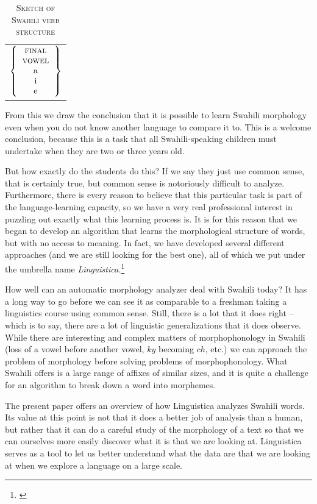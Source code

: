 \documentclass[output=paper,colorlinks,citecolor=brown,
]{langscibook}
\begin{document}
\begin{table}
\begin{tabular}{l}
$\left\{ \begin{tabular}{c} \textsc{final}\\ \textsc{vowel}\\a\\i\\e  \end{tabular}  \right\}$

\end{tabular}
\caption{\textsc{Sketch of Swahili verb structure}}
\label{sketch1}
\end{table}
 
From this we draw the conclusion that it is possible to learn Swahili morphology even when you do not know another language to compare it to. This is a welcome conclusion, because this is a task that all Swahili-speaking children must undertake when they are two or three years old. 

But how exactly do the students do this? If we say they just use common sense, that is certainly true, but common sense is notoriously difficult to analyze. Furthermore, there is every reason to believe that this particular task is part of the language-learning capacity, so we have a very real professional interest in puzzling out exactly what this learning process is. It is for this reason that we began to develop an algorithm that learns the morphological structure of words, but with no access to meaning. In fact, we have developed several different approaches (and we are still looking for the best one), all of which we put under the umbrella name \textit{Linguistica.}\footnote{\citep{Goldsmith2001, Goldsmith2006, Goldsmith2010}}  

How well can an automatic morphology analyzer deal with Swahili today? It has a long way to go before we can see it as comparable to a freshman taking a linguistics course using common sense. Still, there is a lot that it does right -- which is to say, there are a lot of linguistic generalizations that it does observe. While there are interesting and complex matters of morphophonology in Swahili (loss of a vowel before another vowel, $ky$ becoming $ch$, etc.) we can approach the problem of morphology before solving problems of morphophonology. What Swahili offers is a large range of affixes of similar sizes, and it is quite a challenge for an algorithm to break down a word into morphemes.

The present paper offers an overview of how Linguistica analyzes Swahili words. Its value at this point is not that it does a better job of analysis than a human, but rather that it can do a careful study of the morphology of a text so that we can ourselves more easily discover what it is that we are looking at. Linguistica serves as a tool to let us better understand what the data are that we are looking at when we explore a language on a large scale.
\end{document}
